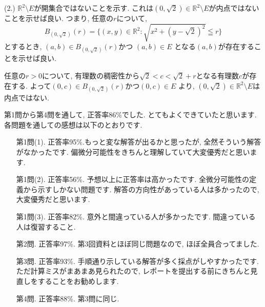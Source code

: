 \documentclass[dvipdfmx,a4paper,11pt]{article}
\newcommand{\R}{\mathbb{R}}
\theoremstyle{definition}
\newcommand{\pdrv}[2]{\frac{\partial #1}{\partial #2}}
\begin{document}
(2.)
$\R^2 \setminus E$が開集合ではないことを示す.
これは$(0,\sqrt{2}) \in \R^2 \setminus E$が内点ではないことを示せば良い.
つまり, 任意の$r$について,
$$
B_{(0,\sqrt{2})}(r) = \{(x,y) \in \R^2 : \sqrt{x^2 + (y - \sqrt{2})^2} \leqq r \}
$$
とするとき, $(a,b) \in B_{(0,\sqrt{2})}(r) $かつ
$(a,b) \in  E$
となる$(a,b)$が存在することを示せば良い.

任意の$r>0$について, 
有理数の稠密性から$\sqrt{2} < c < \sqrt{2}+r$となる有理数$c$が存在する.
よって$(0,c) \in B_{(0,\sqrt{2})}(r)$かつ$(0,c) \in  E$
より, $(0,\sqrt{2}) \in \R^2 \setminus E$は内点ではない.



  
   \vspace{33pt}
   
\hspace{-11pt}{\Large 中間レポートについて}

第1問から第4問を通して, 正答率86\%でした. とてもよくできていたと思います.
各問題を通しての感想は以下のとおりです.
\begin{itemize}
\item [第1問(1).] 正答率95\%.もっと変な解答が出るかと思ったが, 全然そういう解答がなかったです. 偏微分可能性をきちんと理解していて大変優秀だと思います.
\item [第1問(2).] 正答率56\%. 予想以上に正答率は高かったです. 全微分可能性の定義から示すしかない問題です. 解答の方向性があっている人は多かったので, 大変優秀だと思います.
\item [第1問(3).] 正答率82\%. 意外と間違っている人が多かったです. 間違っている人は復習すること.
\item [第2問.] 正答率97\%. 第3回資料とほぼ同じ問題なので, ほぼ全員合ってました.
\item [第3問.] 正答率93\%. 手順通り示している解答が多く採点がしやすかったです. ただ計算ミスがまあまあ見られたので, レポートを提出する前にきちんと見直しをすることをお勧めします.
\item [第4問.] 正答率88\%. 第3問に同じ.
\end{itemize}
\end{document}
